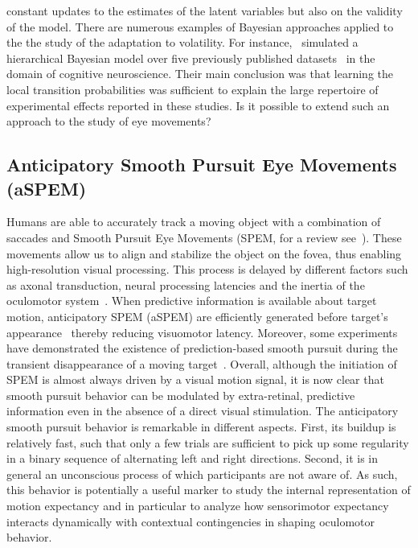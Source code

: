 \documentclass[12pt,english]{article}%
\newcommand{\citep}[1]{\parencite{#1}}
\newcommand{\citet}[1]{\textcite{#1}}
\begin{document}
constant updates to the estimates of the latent variables
but also on the validity of the model.
%
There are numerous examples of Bayesian approaches
applied to the the study of the adaptation to volatility.
For instance,~\citet{Meyniel16} simulated a hierarchical Bayesian model
over five previously published datasets~\citep{Squires1976, Huettel2002, Kolossa2013, Cho2002, Falk1997} in the domain of cognitive neuroscience.
Their main conclusion was that
learning the local transition probabilities
was sufficient to explain the large repertoire
of experimental effects reported in these studies.
%
Is it possible to extend such an approach to the study of eye movements?
\subsection{Anticipatory Smooth Pursuit Eye Movements (aSPEM)}
Humans are able to accurately track a moving object
with a combination of saccades and
Smooth Pursuit Eye Movements (SPEM, for a review see~\citet{Krauzlis2008}).
These movements allow us to align and
stabilize the object on the fovea,
thus enabling high-resolution visual processing.
This process is delayed by different factors such as axonal transduction,
neural processing latencies and the inertia of the oculomotor system~\citep{Krauzlis89}.
When predictive information is available about target motion,
anticipatory SPEM (aSPEM) are
efficiently generated before target's appearance~\citep{Westheimer1954, Kowler1979a, Kowler1979b} thereby reducing visuomotor latency.
Moreover, some experiments have demonstrated the existence
of prediction-based smooth pursuit during
the transient disappearance of a moving target~\citep{Badler2006,BeckerFuchs1985}.
Overall, although the initiation of SPEM is almost always driven by a visual motion signal, it is now clear that smooth pursuit behavior
can be modulated by extra-retinal, predictive information even in the absence of a direct visual stimulation.
The anticipatory smooth pursuit behavior is remarkable
in different aspects.
First, its buildup is relatively fast, such that only a few trials are sufficient
to pick up some regularity in a binary sequence of alternating left and right directions.
Second, it is in general an unconscious process
of which participants are not aware of.
As such, this behavior is potentially a useful marker
to study the internal representation of motion expectancy %
and in particular to analyze how sensorimotor expectancy
interacts dynamically with contextual contingencies in shaping oculomotor behavior.
\end{document}
